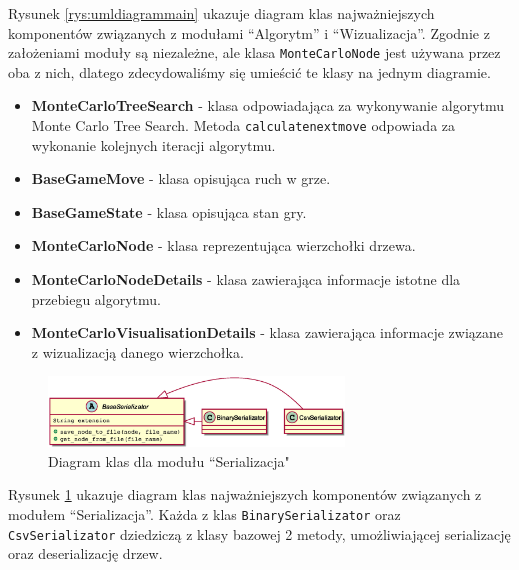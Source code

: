 \documentclass{article}
\newcommand{\code}[1]{\colorbox{light-gray}{\texttt{#1}}}
\begin{document}
	\noindent Rysunek \ref{rys:umldiagrammain} ukazuje diagram klas najważniejszych komponentów związanych z modułami ``Algorytm'' i ``Wizualizacja''. Zgodnie z założeniami moduły są niezależne, ale klasa \code{MonteCarloNode} jest używana przez oba z nich, dlatego zdecydowaliśmy się umieścić te klasy na jednym diagramie. \\
	\begin{itemize}
		\item \textbf{MonteCarloTreeSearch} - klasa odpowiadająca za wykonywanie algorytmu Monte Carlo Tree Search. Metoda \code{calculate\textunderscore next\textunderscore move} odpowiada za wykonanie kolejnych iteracji algorytmu.
		\item \textbf{BaseGameMove} - klasa opisująca ruch w grze.
		\item \textbf{BaseGameState} - klasa opisująca stan gry.
		\item \textbf{MonteCarloNode} - klasa reprezentująca wierzchołki drzewa.
		\item \textbf{MonteCarloNodeDetails} - klasa zawierająca informacje istotne dla przebiegu algorytmu. 
		\item \textbf{MonteCarloVisualisationDetails} - klasa zawierająca informacje związane z wizualizacją danego wierzchołka.
	\end{itemize}
	
	
	\begin{figure}[h!]
		\centering
		\includegraphics[width=0.7\textwidth]{umldiagram_serialization}
		\caption{Diagram klas dla modułu ``Serializacja"}
		\label{rys:umldiagramserialization}
	\end{figure}

	\noindent Rysunek \ref{rys:umldiagramserialization} ukazuje diagram klas najważniejszych komponentów związanych z modułem ``Serializacja''. Każda z klas \code{BinarySerializator} oraz \code{CsvSerializator} dziedziczą z klasy bazowej 2 metody, umożliwiającej serializację oraz deserializację drzew.
	
\end{document}
